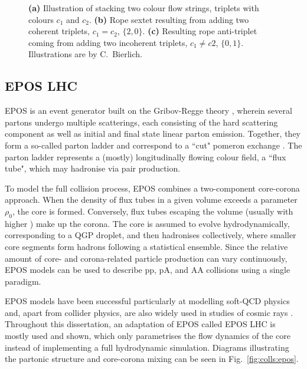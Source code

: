 \begin{figure}[H]
\hspace{1em}
\hspace{1em}
\caption{\textbf{(a)} Illustration of stacking two colour flow strings, triplets with colours $c_1$ and $c_2$.  \textbf{(b)} Rope sextet resulting from adding two coherent triplets, $c_1 = c_2$, $\{2,0\}$. \textbf{(c)} Resulting rope anti-triplet coming from adding two incoherent triplets, $c_1 \neq c2$, $\{0,1\}$. Illustrations are by C.\ Bierlich.}
\label{fig:colls:ropes}
\end{figure}


\subsection{EPOS LHC}

EPOS is an event generator built on the Gribov-Regge theory \cite{drescherPartonBasedGribovReggeTheory2001}, wherein several partons undergo multiple scatterings, each consisting of the hard scattering component as well as initial and final state linear parton emission. Together, they form a so-called parton ladder and correspond to a ``cut" pomeron exchange \cite{wernerPartonLadderSplitting2006}. The parton ladder represents a (mostly) longitudinally flowing colour field, a ``flux tube", which may hadronise via pair production.

To model the full collision process, EPOS combines a two-component core-corona approach. When the density of flux tubes in a given volume exceeds a parameter $\rho_0$, the core is formed. Conversely, flux tubes escaping the volume (usually with higher \pt) make up the corona. The core is assumed to evolve hydrodynamically, corresponding to a QGP droplet, and then hadronises collectively, where smaller core segments form hadrons following a statistical ensemble. Since the relative amount of core- and corona-related particle production can vary continuously, EPOS models can be used to describe pp, pA, and AA collisions using a single paradigm. \cite{pierogEPOSLHCTest2015}

EPOS models have been successful particularly at modelling soft-QCD physics and, apart from collider physics, are also widely used in studies of cosmic rays \cite{pierogEPOSModelUltra2009}. Throughout this dissertation, an adaptation of EPOS called EPOS LHC \cite{pierogEPOSLHCTest2015} is mostly used and shown, which only parametrises the flow dynamics of the core instead of implementing a full hydrodynamic simulation. Diagrams illustrating the partonic structure and core-corona mixing can be seen in Fig.~\ref{fig:colls:epos}.

